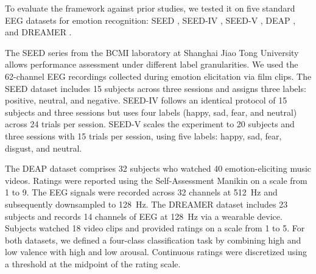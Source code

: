 \documentclass[12pt]{article}
\begin{document}
To evaluate the framework against prior studies, we tested it on five standard EEG datasets for emotion recognition: SEED \cite{ref65}, SEED-IV \cite{ref48}, SEED-V \cite{ref49}, DEAP \cite{ref50}, and DREAMER \cite{ref51}.

The SEED series from the BCMI laboratory at Shanghai Jiao Tong University allows performance assessment under different label granularities. We used the 62-channel EEG recordings collected during emotion elicitation via film clips. The SEED dataset includes 15 subjects across three sessions and assigns three labels: positive, neutral, and negative. SEED-IV follows an identical protocol of 15 subjects and three sessions but uses four labels (happy, sad, fear, and neutral) across 24 trials per session. SEED-V scales the experiment to 20 subjects and three sessions with 15 trials per session, using five labels: happy, sad, fear, disgust, and neutral.

The DEAP dataset comprises 32 subjects who watched 40 emotion-eliciting music videos. Ratings were reported using the Self-Assessment Manikin on a scale from 1 to 9. The EEG signals were recorded across 32 channels at 512~Hz and subsequently downsampled to 128~Hz. The DREAMER dataset includes 23 subjects and records 14 channels of EEG at 128~Hz via a wearable device. Subjects watched 18 video clips and provided ratings on a scale from 1 to 5. For both datasets, we defined a four-class classification task by combining high and low valence with high and low arousal. Continuous ratings were discretized using a threshold at the midpoint of the rating scale.
\end{document}
